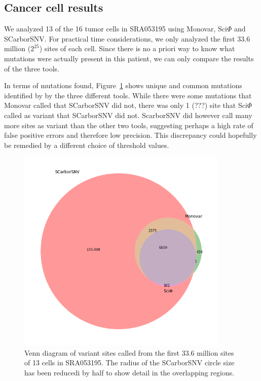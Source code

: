 \documentclass[../../main.tex]{subfiles}
\begin{document}
\subsection*{Cancer cell results}
We analyzed 13 of the 16 tumor cells in SRA053195 using Monovar, Sci$\Phi$ and SCarborSNV.
For practical time considerations, we only analyzed the first 33.6 million ($2^{25}$) sites of each cell.
Since there is no a priori way to know what mutations were actually present in this patient, we can only compare the results of the three tools.

In terms of mutations found, Figure~\ref{fig:venn} shows unique and common mutations identified by by the three different tools.
While there were some mutations that Monovar called that SCarborSNV did not, there was only 1 (???) site that Sci$\Phi$ called as variant that SCarborSNV did not.
ScarborSNV did however call many more sites as variant than the other two tools, suggesting perhaps a high rate of false positive errors and therefore low precision.
This discrepancy could hopefully be remedied by a different choice of threshold values.

\begin{figure}[h]
    \centering
    \includegraphics[width=0.9\textwidth]{sections/graphics/venndiagram}
    \caption{Venn diagram of variant sites called from the first 33.6 million sites of 13 cells in SRA053195.
    The radius of the SCarborSNV circle size has been reducedi by half to show detail in the overlapping regions.}
    \label{fig:venn}
\end{figure}
\end{document}

